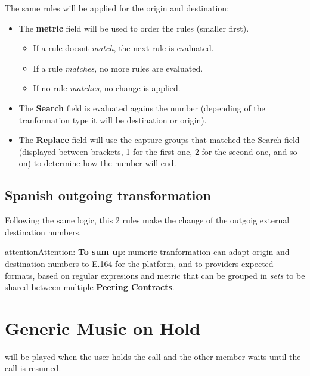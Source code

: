\documentclass[letterpaper,10pt,english]{sphinxmanual}
\begin{document}
The same rules will be applied for the origin and destination:
\begin{itemize}
\item {} 
The \textbf{metric} field will be used to order the rules (smaller first).
\begin{itemize}
\item {} 
If a rule doesnt \emph{match}, the next rule is evaluated.

\item {} 
If a rule \emph{matches}, no more rules are evaluated.

\item {} 
If no rule \emph{matches}, no change is applied.

\end{itemize}

\item {} 
The \textbf{Search} field is evaluated agains the number (depending of the
tranformation type it will be destination or origin).

\item {} 
The \textbf{Replace} field will use the capture groups that matched the Search
field (displayed between brackets, 1 for the first one, 2 for the second
one, and so on) to determine how the number will end.

\end{itemize}


\subsection{Spanish outgoing transformation}
\label{brand/transformations/index:spanish-outgoing-transformation}
Following the same logic, this 2 rules make the change of the outgoig external
destination numbers.

\begin{notice}{attention}{Attention:}
\textbf{To sum up}: numeric tranformation can adapt origin and
destination numbers to E.164 for the platform, and to providers expected
formats, based on regular expresions and metric that can be grouped in \emph{sets}
to be shared between multiple \textbf{Peering Contracts}.
\end{notice}


\section{Generic Music on Hold}
\label{brand/music_on_hold:generic-music-on-hold}\label{brand/music_on_hold::doc}
{\hyperref[company/music_on_hold:music\string-on\string-hold]{}} will be played when the user holds the call and the other
member waits until the call is resumed.
\end{document}
